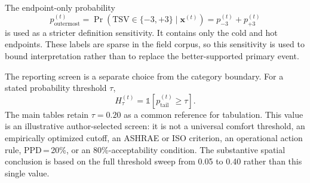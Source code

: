 The endpoint-only probability
\begin{equation}
p_{\mathrm{outermost}}^{(t)}
=\Pr(\mathrm{TSV}\in\{-3,+3\}\mid\mathbf{x}^{(t)})
=p_{-3}^{(t)}+p_{+3}^{(t)}
\end{equation}
is used as a stricter definition sensitivity. It contains only the cold and hot endpoints. These labels are sparse in the field corpus, so this sensitivity is used to bound interpretation rather than to replace the better-supported primary event.

The reporting screen is a separate choice from the category boundary. For a stated probability threshold $\tau$,
\begin{equation}
H_{\tau}^{(t)}=\mathbb{1}\!\left[p_{\mathrm{tail}}^{(t)}\ge\tau\right].
\end{equation}
The main tables retain $\tau=0.20$ as a common reference for tabulation. This value is an illustrative author-selected screen: it is not a universal comfort threshold, an empirically optimized cutoff, an ASHRAE or ISO criterion, an operational action rule, PPD\,=\,20\%, or an 80\%-acceptability condition. The substantive spatial conclusion is based on the full threshold sweep from 0.05 to 0.40 rather than this single value.

